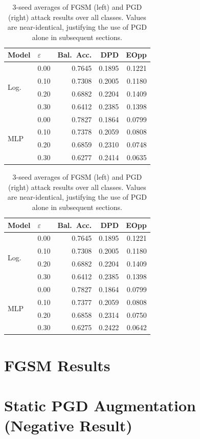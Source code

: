 \documentclass[11pt]{article}
\begin{document}
\begin{table}[H]
\centering
\caption{3-seed averages of FGSM (left) and PGD (right) attack results over all classes. Values are near-identical, justifying the use of PGD alone in subsequent sections.}
\label{tab:fgsm_pgd}
\begin{minipage}{0.49\textwidth}
\centering
\begin{tabular}{llrrr}
\toprule
Model & $\varepsilon$ & Bal.\ Acc. & DPD & EOpp \\
\midrule
\multirow{4}{*}{Log.}
 & 0.00 & 0.7645 & 0.1895 & 0.1221 \\
 & 0.10 & 0.7308 & 0.2005 & 0.1180 \\
 & 0.20 & 0.6882 & 0.2204 & 0.1409 \\
 & 0.30 & 0.6412 & 0.2385 & 0.1398 \\
\midrule
\multirow{4}{*}{MLP}
 & 0.00 & 0.7827 & 0.1864 & 0.0799 \\
 & 0.10 & 0.7378 & 0.2059 & 0.0808 \\
 & 0.20 & 0.6859 & 0.2310 & 0.0748 \\
 & 0.30 & 0.6277 & 0.2414 & 0.0635 \\
\bottomrule
\end{tabular}
\end{minipage}
\hfill
\begin{minipage}{0.49\textwidth}
\centering
\begin{tabular}{llrrr}
\toprule
Model & $\varepsilon$ & Bal.\ Acc. & DPD & EOpp \\
\midrule
\multirow{4}{*}{Log.}
 & 0.00 & 0.7645 & 0.1895 & 0.1221 \\
 & 0.10 & 0.7308 & 0.2005 & 0.1180 \\
 & 0.20 & 0.6882 & 0.2204 & 0.1409 \\
 & 0.30 & 0.6412 & 0.2385 & 0.1398 \\
\midrule
\multirow{4}{*}{MLP}
 & 0.00 & 0.7827 & 0.1864 & 0.0799 \\
 & 0.10 & 0.7377 & 0.2059 & 0.0808 \\
 & 0.20 & 0.6858 & 0.2314 & 0.0750 \\
 & 0.30 & 0.6275 & 0.2422 & 0.0642 \\
\bottomrule
\end{tabular}
\end{minipage}
\end{table}

\section{FGSM Results}

\section{Static PGD Augmentation (Negative Result)}



\end{document}

